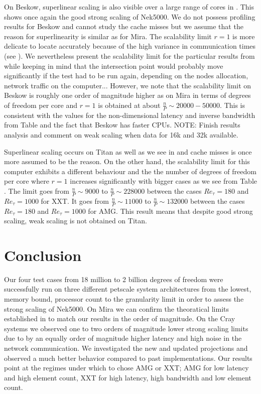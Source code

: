 \documentclass{sig-alternate}
\begin{document}
On Beskow, superlinear scaling is also visible over a large range of cores in . This shows once again the good strong scaling of Nek5000. We do not possess profiling results for Beskow and cannot study the cache misses but we assume that the reason for superlinearity is similar as for Mira. The scalability limit $r=1$ is more delicate to locate accurately because of the high variance in communication times (see ). We nevertheless present the scalability limit for the particular results from  while keeping in mind that the intersection point would probably move significantly if the test had to be run again, depending on the nodes allocation, network traffic on the computer... However, we note that the scalability limit on Beskow is roughly one order of magnitude higher as on Mira in terms of degrees of freedom per core and $r=1$ is obtained at about $\frac{n}{P} \sim 20000 - 50000$. This is consistent with the values for the non-dimensional latency and inverse bandwidth from Table  and the fact that Beskow has faster CPUs.
NOTE: Finish results analysis and comment on weak scaling when data for 16k and 32k available.


Superlinear scaling occurs on Titan as well as we see in  and cache misses is once more assumed to be the reason. On the other hand, the scalability limit for this computer exhibits a different behaviour and the the number of degrees of freedom per core where $r=1$ increases significantly with bigger cases as we see from Table . The limit goes from $\frac{n}{P} \sim 9000$ to $\frac{n}{P} \sim 228000$ between the cases $Re_{\tau}=180$ and $Re_{\tau}=1000$ for XXT. It goes from $\frac{n}{P} \sim 11000$ to $\frac{n}{P} \sim 132000$ between the cases $Re_{\tau}=180$ and $Re_{\tau}=1000$ for AMG. This result means that despite good strong scaling, weak scaling is not obtained on Titan.


\section{Conclusion}
Our four test cases from 18 million to 2 billion degrees of freedom were
successfully run on three different petscale system architectures from the
lowest, memory bound, processor count to the granularity limit in order to
assess the strong scaling of Nek5000. On Mira we can confirm the theoratical
limits established in \cite{fischer:scaling} to match our results in the order
of magnitude. On the Cray systems we observed one to two orders of magnitude
lower strong scaling limits due to by an equally order of magnitude higher
latency and high noise in the network communication. We investigated the new
and updated projections and observed a much better behavior compared to past
implementations. Our results point at the regimes under which to chose AMG or
XXT; AMG for low latency and high element count, XXT for high latency, high
bandwidth and low element count. 
\end{document}
